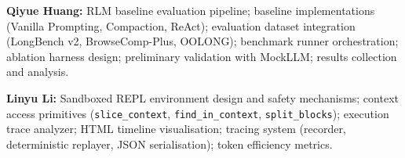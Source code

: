 \documentclass{article}
\begin{document}
\textbf{Qiyue Huang:} RLM baseline evaluation pipeline; baseline implementations (Vanilla Prompting, Compaction, ReAct); evaluation dataset integration (LongBench v2, BrowseComp-Plus, OOLONG); benchmark runner orchestration; ablation harness design; preliminary validation with MockLLM; results collection and analysis.

\textbf{Linyu Li:} Sandboxed REPL environment design and safety mechanisms; context access primitives (\texttt{slice\_context}, \texttt{find\_in\_context}, \texttt{split\_blocks}); execution trace analyzer; HTML timeline visualisation; tracing system (recorder, deterministic replayer, JSON serialisation); token efficiency metrics.



\end{document}
